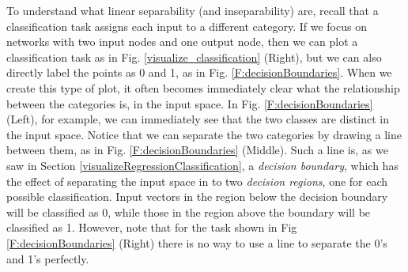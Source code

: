 To understand what linear separability (and inseparability) are, recall that a classification task assigns each input to a different category. If we focus on networks with two input nodes and one output node, then we can plot a classification task as in Fig. \ref{visualize_classification} (Right), but we can also directly label the points as 0 and 1, as in Fig. \ref{F:decisionBoundaries}. When we create this type of plot, it often becomes immediately clear what the relationship between the categories is, in the input space. In Fig. \ref{F:decisionBoundaries} (Left), for example, we can immediately see that the two classes are distinct in the input space. Notice that we can separate the two categories by drawing a line between them, as in Fig. \ref{F:decisionBoundaries} (Middle). Such a line is, as we saw in  Section \ref{visualizeRegressionClassification}, a \emph{decision boundary}, which has the effect of separating the input space in to two \emph{decision regions}, one for each possible classification. Input vectors in the region below the decision boundary will be classified as 0, while those in the region above the boundary will be classified as 1. However, note that for the task shown in Fig \ref{F:decisionBoundaries} (Right) there is no way to use a line to separate the 0's and 1's perfectly.

